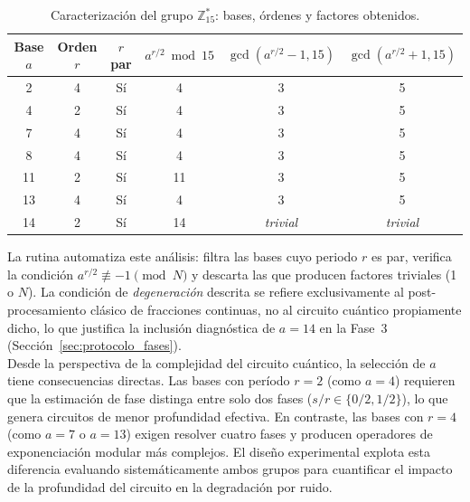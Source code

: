 \documentclass[12pt, spanish]{book}
\begin{document}
\begin{table}[htbp]
    \centering
    \caption{Caracterización del grupo $\mathbb{Z}_{15}^*$: bases, órdenes y factores obtenidos.\\}
    \label{tab:caracterizacion_a}
    \begin{tabular}{cccccc}
        \toprule
        \textbf{Base $a$} & \textbf{Orden $r$} & \textbf{$r$ par} & $a^{r/2} \bmod 15$ & $\gcd(a^{r/2}-1, 15)$ & $\gcd(a^{r/2}+1, 15)$ \\
        \midrule
        2  & 4 & Sí & 4  & 3                & 5                \\
        4  & 2 & Sí & 4  & 3                & 5                \\
        7  & 4 & Sí & 4  & 3                & 5                \\
        8  & 4 & Sí & 4  & 3                & 5                \\
        11 & 2 & Sí & 11 & 3                & 5                \\
        13 & 4 & Sí & 4  & 3                & 5                \\
        14 & 2 & Sí & 14 & \textit{trivial} & \textit{trivial} \\
        \bottomrule
    \end{tabular}
\end{table}

La rutina automatiza este análisis: filtra las bases cuyo periodo $r$ es par, verifica la condición $a^{r/2} \not\equiv -1 \pmod{N}$ y descarta las que producen factores triviales (1 o $N$). La condición de \textit{degeneración} descrita se refiere exclusivamente al post-procesamiento clásico de fracciones continuas, no al circuito cuántico propiamente dicho, lo que justifica la inclusión diagnóstica de $a = 14$ en la Fase~3 (Sección~\ref{sec:protocolo_fases}).\\

Desde la perspectiva de la complejidad del circuito cuántico, la selección de $a$ tiene consecuencias directas. Las bases con período $r = 2$ (como $a = 4$) requieren que la estimación de fase distinga entre solo dos fases ($s/r \in \{0/2, 1/2\}$), lo que genera circuitos de menor profundidad efectiva. En contraste, las bases con $r = 4$ (como $a = 7$ o $a = 13$) exigen resolver cuatro fases y producen operadores de exponenciación modular más complejos. El diseño experimental explota esta diferencia evaluando sistemáticamente ambos grupos para cuantificar el impacto de la profundidad del circuito en la degradación por ruido.
\end{document}
